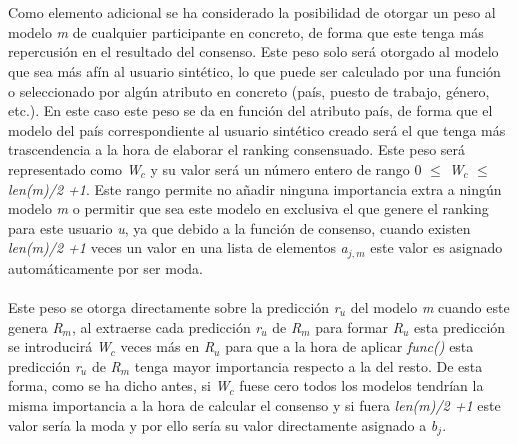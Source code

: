 \\ \\
Como elemento adicional se ha considerado la posibilidad de otorgar un peso al modelo \textit{m} de cualquier participante en concreto, de forma que este tenga más repercusión en el resultado del consenso. Este peso solo será otorgado al modelo que sea más afín al usuario sintético, lo que puede ser calculado por una función o seleccionado por algún atributo en concreto (país, puesto de trabajo, género, etc.). En este caso este peso se da en función del atributo país, de forma que el modelo del país correspondiente al usuario sintético creado será el que tenga más trascendencia a la hora de elaborar el ranking consensuado. Este peso será representado como \textit{W$_{c}$} y su valor será un número entero de rango 0 $\leq$ \textit{W$_{c}$} $\leq$ \textit{len(m)/2 +1}. Este rango permite no añadir ninguna importancia extra a ningún modelo \textit{m} o permitir que sea este modelo en exclusiva el que genere el ranking para este usuario \textit{u}, ya que debido a la función de consenso, cuando existen \textit{len(m)/2 +1} veces un valor en una lista de elementos \textit{a$_{j, m}$} este valor es asignado automáticamente por ser moda.
\\ \\
Este peso se otorga directamente sobre la predicción \textit{r$_{u}$} del modelo \textit{m} cuando este genera \textit{R$_{m}$}, al extraerse cada predicción \textit{r$_{u}$} de \textit{R$_{m}$} para formar \textit{R$_{u}$} esta predicción se introducirá \textit{W$_{c}$} veces más en \textit{R$_{u}$} para que a la hora de aplicar \textit{func()} esta predicción \textit{r$_{u}$} de \textit{R$_{m}$} tenga mayor importancia respecto a la del resto. De esta forma, como se ha dicho antes, si \textit{W$_{c}$} fuese cero todos los modelos tendrían la misma importancia a la hora de calcular el consenso y si fuera \textit{len(m)/2 +1} este valor sería la moda y por ello sería su valor directamente asignado a \textit{b$_{j}$}.

